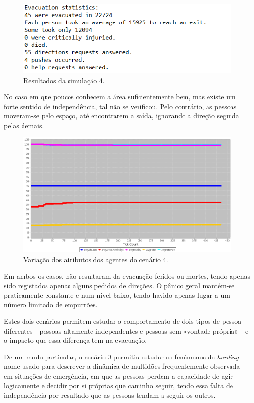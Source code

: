 \documentclass[12pt]{article}
\begin{document}
\begin{titlepage}
\begin{itemize}
\begin{figure}[H]
	\centering
	\includegraphics{log_sc_independent.png}
	\caption{Resultados da simulação 4.}
	\label{log_sc1}
\end{figure}

No caso em que poucos conhecem a área suficientemente bem, mas existe um forte sentido de independência, tal não se verificou. Pelo contrário, as pessoas moveram-se pelo espaço, até encontrarem a saída, ignorando a direção seguida pelas demais.

\begin{figure}[H]
	\centering
	\includegraphics[scale=.6]{graph_sc_independent.png}
	\caption{Variação dos atributos dos agentes do cenário 4.}
	\label{graph_sc1}
\end{figure}

Em ambos os casos, não resultaram da evacuação feridos ou mortes, tendo apenas sido registados apenas alguns pedidos de direções. O pânico geral mantém-se praticamente constante e num nível baixo, tendo havido apenas lugar a um número limitado de empurrões.

Estes dois cenários permitem estudar o comportamento de dois tipos de pessoa diferentes - pessoas altamente independentes e pessoas sem «vontade própria» - e o impacto que essa diferença tem na evacuação. 

De um modo particular, o cenário 3 permitiu estudar os fenómenos de \textit{herding} - nome usado para descrever a dinâmica de multidões frequentemente observada em situações de emergência, em que as pessoas perdem a capacidade de agir logicamente e decidir por si próprias que caminho seguir, tendo essa falta de independência por resultado que as pessoas tendam a seguir os outros. \newline


\end{itemize}
\end{titlepage}
\end{document}
